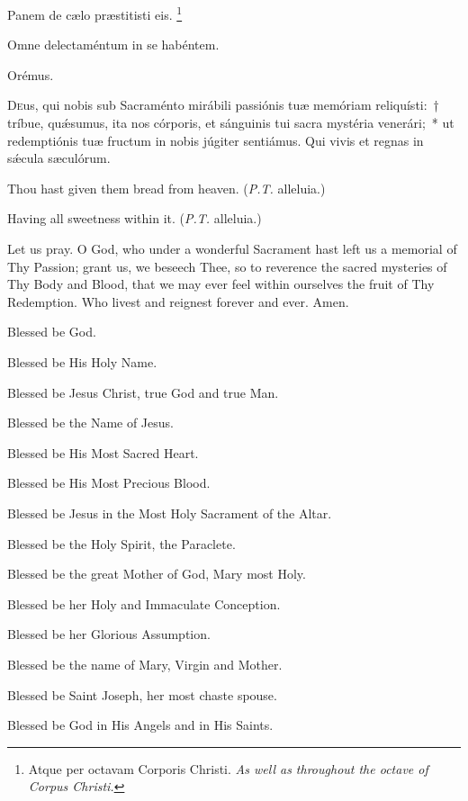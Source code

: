 \documentclass[11pt]{book}
\begin{document}
   \begin{paracol}{2}

\noindent \vv Panem de cælo præstitisti eis. \tpalleluia{}\footnote{Atque per octavam Corporis Christi. \textit{As well as throughout the octave of Corpus Christi.}}

\noindent \rr Omne dele\-ctaméntum in se habéntem. \tpalleluia{}

  Orémus.
  
  \lettrine{D}{e}us, qui nobis sub Sacraménto mirábili passiónis tuæ memóriam reliquísti:~† tríbue, quǽsumus, ita nos córporis, et sánguinis tui sacra mystéria venerári;~* ut redemptiónis tuæ fructum in nobis júgiter sentiámus. Qui vivis et regnas in sǽcula sæculórum. 

  \switchcolumn
\begin{otherlanguage}{english}
\noindent \vv Thou hast given them bread from heaven. (\textit{P.T.} alleluia.)

\noindent \rr Having all sweetness within it. (\textit{P.T.} alleluia.)

\noindent Let us pray. O God, who under a wonderful Sacrament hast left us a memorial of Thy Passion; grant us, we beseech Thee, so to reverence the sacred mysteries of Thy Body and Blood, that we may ever feel within ourselves the fruit of Thy Redemption. Who livest and reignest forever and ever. Amen.
\end{otherlanguage}\end{paracol}

\begin{multicols}{2}
\raggedcolumns
\begin{otherlanguage}{english}

Blessed be God. 

Blessed be His Holy Name. 

Blessed be Jesus Christ, true God and true Man.
 
Blessed be the Name of Jesus.

Blessed be His Most Sacred Heart.

Blessed be His Most Precious Blood.

Blessed be Jesus in the Most Holy Sacrament of the Altar.

Blessed be the Holy Spirit, the Paraclete.

Blessed be the great Mother of God, Mary most Holy.

Blessed be her Holy and Immaculate Conception.


Blessed be her Glorious Assumption.

Blessed be the name of Mary, Virgin and Mother.

Blessed be Saint Joseph, her most chaste spouse.

Blessed be God in His Angels and in His Saints.

\end{otherlanguage}
\end{multicols}
\end{document}
